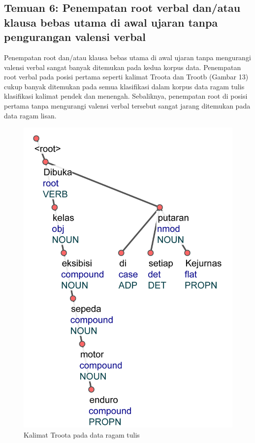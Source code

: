 \subsection{Temuan 6: Penempatan root verbal dan/atau klausa bebas utama di awal ujaran tanpa pengurangan valensi verbal}
Penempatan root dan/atau klausa bebas utama di awal ujaran tanpa mengurangi valensi verbal sangat banyak ditemukan pada kedua korpus data. Penempatan root verbal pada posisi pertama seperti kalimat Troota dan Trootb (Gambar 13) cukup banyak ditemukan pada semua klasifikasi dalam korpus data ragam tulis klasifikasi kalimat pendek dan menengah. Sebaliknya, penempatan root di posisi pertama tanpa mengurangi valensi verbal tersebut sangat jarang ditemukan pada data ragam lisan.

\begin{figure}
	\centering \includegraphics[width=1
	\textwidth] {pics/ts770.jpg} 
	\caption{Kalimat Troota pada data ragam tulis}
	\label{fig:ts770} 
\end{figure}

